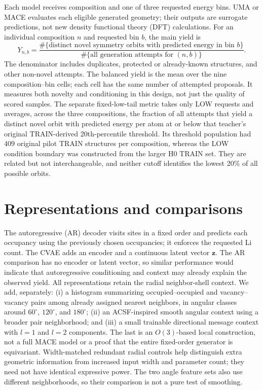 \documentclass[11pt]{article}
\begin{document}
Each model receives composition and one of three requested energy bins. UMA or MACE evaluates each eligible generated geometry; their outputs are surrogate predictions, not new density functional theory (DFT) calculations. For an individual composition $n$ and requested bin $b$, the main yield is
\begin{equation}
Y_{n,b}=\frac{\#\{\text{distinct novel symmetry orbits with predicted energy in bin }b\}}{\#\{\text{all generation attempts for }(n,b)\}}.
\end{equation}
The denominator includes duplicates, protected or already-known structures, and other non-novel attempts. The balanced yield is the mean over the nine composition--bin cells; each cell has the same number of attempted proposals. It measures both novelty and conditioning in this design, not just the quality of scored samples. The separate fixed-low-tail metric takes only LOW requests and averages, across the three compositions, the fraction of all attempts that yield a distinct novel orbit with predicted energy per atom at or below that teacher's original TRAIN-derived 20th-percentile threshold. Its threshold population had 409 original pilot TRAIN structures per composition, whereas the LOW condition boundary was constructed from the larger H0 TRAIN set. They are related but not interchangeable, and neither cutoff identifies the lowest 20\% of all possible orbits.

\section{Representations and comparisons}
The autoregressive (AR) decoder visits sites in a fixed order and predicts each occupancy using the previously chosen occupancies; it enforces the requested Li count. The CVAE adds an encoder and a continuous latent vector $\mathbf{z}$. The AR comparison has no encoder or latent vector, so similar performance would indicate that autoregressive conditioning and context may already explain the observed yield. All representations retain the radial neighbor-shell context. We add, separately: (i) a histogram summarizing occupied--occupied and vacancy--vacancy pairs among already assigned nearest neighbors, in angular classes around $60^\circ$, $120^\circ$, and $180^\circ$; (ii) an ACSF-inspired smooth angular context using a broader pair neighborhood; and (iii) a small trainable directional message context with $l=1$ and $l=2$ components. The last is an $O(3)$-based local construction, not a full MACE model or a proof that the entire fixed-order generator is equivariant. Width-matched redundant radial controls help distinguish extra geometric information from increased input width and parameter count; they need not have identical expressive power. The two angle feature sets also use different neighborhoods, so their comparison is not a pure test of smoothing.
\end{document}

